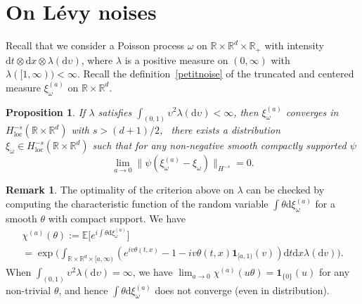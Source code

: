 \documentclass[JEP,XML,SOM,Unicode,published]{cedram}
\newtheorem{proposition}[theorem]{Proposition}
\theoremstyle{definition}
\newtheorem{rem}[theorem]{Remark}
\newcommand{\dd}{\mathrm{d}}
\newcommand{\ind}{\mathbf{1}}
\newcommand{\bbE}{{\ensuremath{\mathbb E}} }
\newcommand{\bbR}{{\ensuremath{\mathbb R}} }
\let\gl\lambda
\let\ups\upsilon
\let\go\omega
\begin{document}
\appendix

\section{On Lévy noises}

Recall that we consider a Poisson process $\go$ on $\bbR\times \bbR^d \times \bbR_+$ with intensity
\hbox{$\dd t \otimes \dd x \otimes \gl(\dd \ups)$},
where $\gl$ is a positive measure on $(0,\infty)$ with $\lambda([1,\infty))<\infty$.
Recall the definition~\eqref{petitnoise} of the truncated and centered measure $\xi_{\go}^{(a)}$ on $\bbR\times \bbR^d$.

\begin{proposition}\label{convergence2}
If $\gl$ satisfies
$\int_{(0,1)} \ups^2 \gl(\dd \ups)<\infty$,
then $\xi^{(a)}_{\go}$ converges in \hbox{$H^{-s}_{\mathrm{loc}}(\bbR\times \bbR^d)$} with $s>(d+1)/2$, \ie \ there exists a distribution $\xi_{\go} \in H^{-s}_{\mathrm{loc}}(\bbR\times \bbR^d)$ such that
for any non-negative smooth compactly supported $\psi$
\begin{equation}
\lim_{a\to 0} \| \psi(\xi_{\go}^{(a)}-\xi_{\go}) \|_{H^{-s}}=0.
\end{equation}
\end{proposition}

\begin{rem}
\label{rem:noiseL2}
The optimality of the criterion above on $\gl$ can be checked by computing the characteristic function of the random variable $\int \theta \dd \xi_{\go}^{(a)}$ for a smooth $\theta$ with compact support. We have
\begin{multline*}
\chi^{(a)}(\theta):=\bbE\bigl[ e^{i \int \theta \dd \xi_{\go}^{(a)}} \bigr] \\
=\exp\biggl(\int_{ \bbR\times \bbR^d \times [a,\infty)} \left(e^{i v \theta(t,x)}-1-iv\theta(t,x)\ind_{[a,1)}(v)\right) \dd t \dd x \gl(\dd v)\biggr).
\end{multline*}
When $\int_{(0,1)} \ups^2 \gl(\dd \ups)=\infty$, we have $\lim_{a\to 0} \chi^{(a)}(u\theta)=\ind_{\{0\}}(u)$ for any non-trivial $\theta$, and hence $\int \theta \dd \xi_{\go}^{(a)}$ does not converge (even in distribution).
\end{rem}
\end{document}
